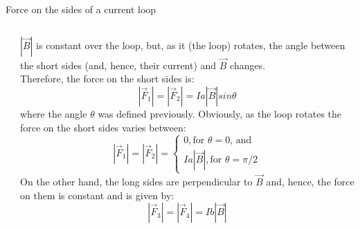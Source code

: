 \begin{frame}{Force on the sides of a current loop}
\begin{columns}
\begin{column}{0.37\textwidth}
  \end{column}
  \begin{column}{0.63\textwidth}
  {\small
    $|\vec{B}|$ is constant over the loop,
    but, as it (the loop) rotates, the angle between the short sides (and, hence, their current)
    and $\vec{B}$ changes.\\
    \vspace{0.2cm}
    Therefore, the force on the short sides is:
    \begin{equation*}
      |\vec{F}_1| = |\vec{F}_2| = I a |\vec{B}| sin\theta
    \end{equation*}
    where the angle $\theta$ was defined previously.
    Obviously, as the loop rotates the force on the short sides varies between:
    \begin{equation*}
      |\vec{F}_1| = |\vec{F}_2| =
        \left\{
          \begin{array}{l}
             0, \text{for $\theta = 0$, and} \\
             I a |\vec{B}|, \text{for $\theta = \pi/2$}
          \end{array}
        \right.
    \end{equation*}
    On the other hand, the long sides are perpendicular to $\vec{B}$
    and, hence, the force on them is constant and is given by:
    \begin{equation*}
      |\vec{F}_3| = |\vec{F}_4| = I b |\vec{B}|
    \end{equation*}
  }
  \end{column}
\end{columns}

\end{frame}

%
%
%


